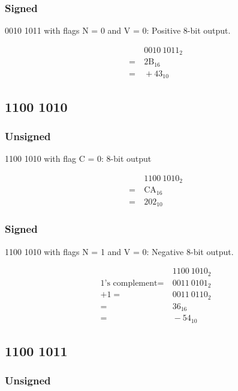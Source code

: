 \documentclass[12pt,a4paper]{article}
\begin{document}
\subsubsection{Signed}

0010 1011 with flags N = 0 and V = 0: Positive 8-bit output.

\begin{align*}
&\ 0010\ 1011_{2} \\
=&\ 2\text{B}_{16} \\
=&\ +43_{10}
\end{align*}

\subsection{1100 1010}

\subsubsection{Unsigned}

1100 1010 with flag C = 0: 8-bit output

\begin{align*}
&\ 1100\ 1010_{2} \\
=&\ \text{CA}_{16} \\
=&\ 202_{10}
\end{align*}

\subsubsection{Signed}

1100 1010 with flags N = 1 and V = 0: Negative 8-bit output.

\begin{align*}
&\ 1100\ 1010_{2} \\
\text{1's complement} =&\ 0011\ 0101_{2} \\
+ 1 =&\ 0011\ 0110_{2} \\
=&\ 36_{16} \\
=&\ -54_{10}
\end{align*}

\subsection{1100 1011}

\subsubsection{Unsigned}
\end{document}
